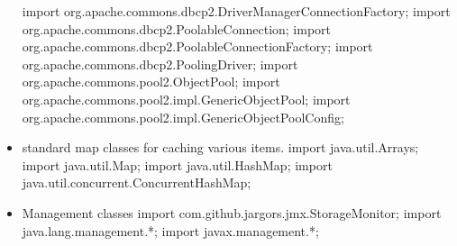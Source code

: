 \begin{itemize}
import org.apache.commons.dbcp2.DriverManagerConnectionFactory;
import org.apache.commons.dbcp2.PoolableConnection;
import org.apache.commons.dbcp2.PoolableConnectionFactory;
import org.apache.commons.dbcp2.PoolingDriver;
import org.apache.commons.pool2.ObjectPool;
import org.apache.commons.pool2.impl.GenericObjectPool;
import org.apache.commons.pool2.impl.GenericObjectPoolConfig;
\nwendcode{}\item standard map classes for caching various items.
\nwenddocs{}\plusendmoddef
import java.util.Arrays;
import java.util.Map;
import java.util.HashMap;
import java.util.concurrent.ConcurrentHashMap;
\nwendcode{}\item Management classes
\nwenddocs{}\plusendmoddef
import com.github.jargors.jmx.StorageMonitor;
import java.lang.management.*;
import javax.management.*;
\nwendcode{}\nwdocspar
\end{itemize}

